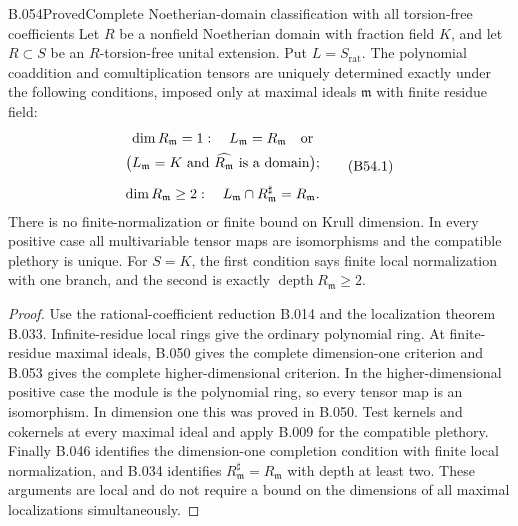 \begin{saresult}{B.054}{Proved}{Complete Noetherian-domain classification with all torsion-free coefficients}
Let $R$ be a nonfield Noetherian domain with
fraction field $K$, and let $R\subset S$ be an
$R$-torsion-free unital extension. Put
$L=S_{\mathrm{rat}}$.
The polynomial coaddition and comultiplication
tensors are uniquely determined exactly under
the following conditions, imposed only at
maximal ideals $\mathfrak m$ with finite residue field:
\[
\begin{gathered}
 \dim R_{\mathfrak m}=1:\quad
 L_{\mathfrak m}=R_{\mathfrak m}\quad\hbox{or}\\
 \bigl(L_{\mathfrak m}=K\text{ and }
        \widehat{R_{\mathfrak m}}\text{ is a domain}\bigr);\\[2mm]
 \dim R_{\mathfrak m}\ge2:\quad
 L_{\mathfrak m}\cap R_{\mathfrak m}^{\sharp}=R_{\mathfrak m}.
\end{gathered}                                                   \tag{B54.1}
\]
There is no finite-normalization or finite bound on
Krull dimension. In every positive case all
multivariable tensor maps are isomorphisms and
the compatible plethory is unique.
For $S=K$, the first condition says finite local
normalization with one branch, and the second
is exactly $\operatorname{depth}R_{\mathfrak m}\ge2$.
\end{saresult}
\begin{proof}
Use the rational-coefficient reduction B.014 and
the localization theorem B.033. Infinite-residue
local rings give the ordinary polynomial ring.
At finite-residue maximal ideals, B.050 gives
the complete dimension-one criterion and B.053
gives the complete higher-dimensional criterion.
In the higher-dimensional positive case the
module is the polynomial ring, so every tensor
map is an isomorphism. In dimension one this
was proved in B.050. Test kernels and cokernels
at every maximal ideal and apply B.009 for
the compatible plethory. Finally B.046 identifies
the dimension-one completion condition with
finite local normalization, and B.034 identifies
$R_{\mathfrak m}^{\sharp}=R_{\mathfrak m}$ with
depth at least two. These arguments are local
and do not require a bound on the dimensions
of all maximal localizations simultaneously.
\end{proof}
